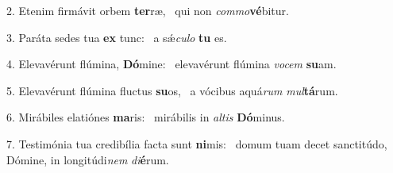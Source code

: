2. Etenim firmávit orbem \textbf{ter}ræ, \ast\  qui non \textit{com}\textit{mo}\textbf{vé}bitur.\

3. Paráta sedes tua \textbf{ex} tunc: \ast\  a sǽ\textit{cu}\textit{lo} \textbf{tu} es.\

4. Elevavérunt flúmina, \textbf{Dó}mine: \ast\  elevavérunt flúmina \textit{vo}\textit{cem} \textbf{su}am.\

5. Elevavérunt flúmina fluctus \textbf{su}os, \ast\  a vócibus aquá\textit{rum} \textit{mul}\textbf{tá}rum.\

6. Mirábiles elatiónes \textbf{ma}ris: \ast\  mirábilis in \textit{al}\textit{tis} \textbf{Dó}minus.\

7. Testimónia tua credibília facta sunt \textbf{ni}mis: \ast\  domum tuam decet sanctitúdo, Dómine, in longitúdi\textit{nem} \textit{di}\textbf{é}rum.\

